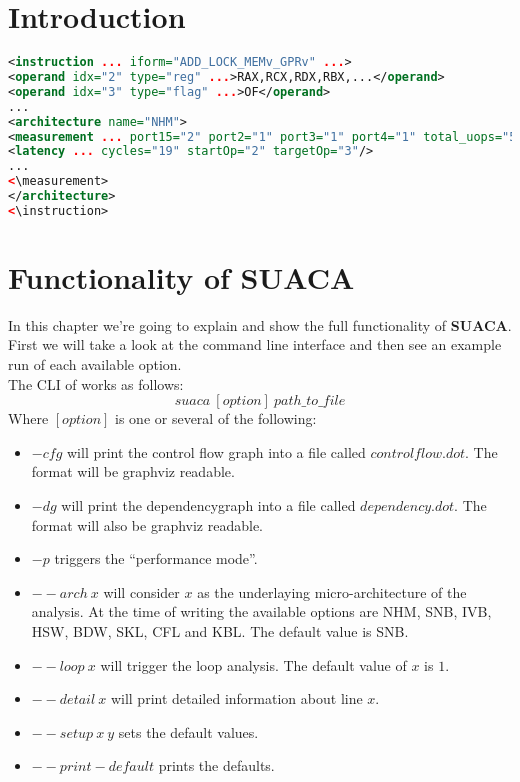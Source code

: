 \documentclass[a4paper,12pt,titlepage, twoside]{report}
\newcommand{\suaca}{\textbf{SUACA}}
\begin{document}
\newpage
\thispagestyle{empty}
\mbox{}

\setcounter{page}{0}
\tableofcontents 



\chapter{Introduction}
\begin{lstlisting}[language=XML, basicstyle=\ttfamily\scriptsize, breaklines=true, label=lst:xml]
<instruction ... iform="ADD_LOCK_MEMv_GPRv" ...>
<operand idx="2" type="reg" ...>RAX,RCX,RDX,RBX,...</operand>
<operand idx="3" type="flag" ...>OF</operand>
...
<architecture name="NHM">
<measurement ... port15="2" port2="1" port3="1" port4="1" total_uops="5">
<latency ... cycles="19" startOp="2" targetOp="3"/>
...
<\measurement>
</architecture>
<\instruction>
\end{lstlisting}









\chapter{Functionality of SUACA}
In this chapter we're going to explain and show the full functionality of \suaca. First we will take a look at the command line interface and then see an example run of each available option.\\
The CLI of works as follows:\\
\[
suaca\ [option]\ path\_to\_file
\]
Where $[option]$ is one or several of the following:
\begin{itemize}
    \item $-cfg$ will print the control flow graph into a file called $controlflow.dot$. The format will be graphviz readable.
    \item $-dg$ will print the dependencygraph into a file called $dependency.dot$. The format will also be graphviz readable.
    \item $-p$ triggers the ``performance mode''.
    \item ${--}arch\ x$ will consider $x$ as the underlaying micro-architecture of the analysis. At the time of writing the available options are NHM, SNB, IVB, HSW, BDW, SKL, CFL and KBL. The default value is SNB.
    \item ${--}loop\ x$ will trigger the loop analysis. The default value of $x$ is $1$.
    \item ${--}detail\ x$ will print detailed information about line $x$.
    \item ${--}setup\ x\ y$ sets the default values.
    \item ${--}print-default$ prints the defaults.
\end{itemize}
\end{document}
